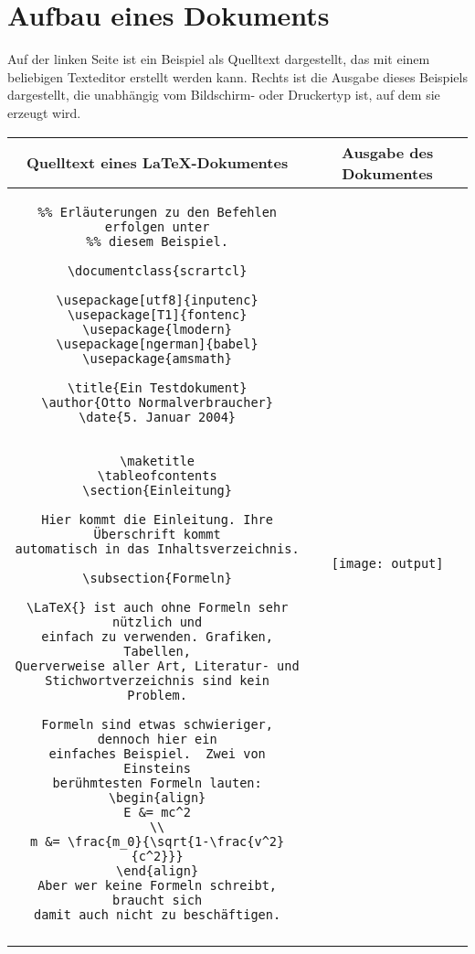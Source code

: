 
\section{Aufbau eines Dokuments}
Auf der linken Seite ist ein Beispiel als Quelltext dargestellt, das mit einem beliebigen Texteditor erstellt werden kann. Rechts ist die Ausgabe dieses Beispiels dargestellt, die unabhängig vom Bildschirm- oder Druckertyp ist, auf dem sie erzeugt wird.


\begin{tabular}{c|c}
Quelltext eines LaTeX-Dokumentes&Ausgabe des Dokumentes\\
\hline
\begin{minipage}[b]{\textwidth/2}
\lstset{basicstyle=\tiny}
\begin{lstlisting}
%% Erläuterungen zu den Befehlen erfolgen unter
%% diesem Beispiel.

\documentclass{scrartcl}

\usepackage[utf8]{inputenc}
\usepackage[T1]{fontenc}
\usepackage{lmodern}
\usepackage[ngerman]{babel}
\usepackage{amsmath}

\title{Ein Testdokument}
\author{Otto Normalverbraucher}
\date{5. Januar 2004}


\maketitle
\tableofcontents
\section{Einleitung}

Hier kommt die Einleitung. Ihre Überschrift kommt
automatisch in das Inhaltsverzeichnis.

\subsection{Formeln}

\LaTeX{} ist auch ohne Formeln sehr nützlich und
einfach zu verwenden. Grafiken, Tabellen,
Querverweise aller Art, Literatur- und
Stichwortverzeichnis sind kein Problem.

Formeln sind etwas schwieriger, dennoch hier ein
einfaches Beispiel.  Zwei von Einsteins
berühmtesten Formeln lauten:
\begin{align}
E &= mc^2                                  \\
m &= \frac{m_0}{\sqrt{1-\frac{v^2}{c^2}}}
\end{align}
Aber wer keine Formeln schreibt, braucht sich
damit auch nicht zu beschäftigen.

\end{lstlisting}
\end{minipage}
&
\begin{minipage}[t]{\textwidth/2}

		\texttt{[image: output]}

\end{minipage}\\
\label{tab:codeOutput}
\end{tabular} 

